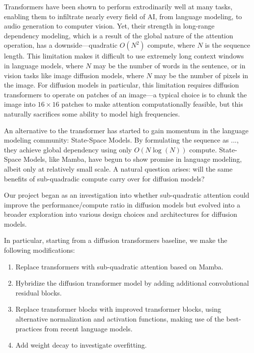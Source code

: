 Transformers have been shown to perform extrodinarily well at many tasks, enabling
them to infiltrate nearly every field of AI, from language modeling, to audio generation
to computer vision. Yet, their strength in long-range dependency modeling, which is a result
of the global nature of the attention operation, has a downside—quadratic $O(N^2)$ compute,
where $N$ is the sequence length. This limitation makes it difficult to use extremely long
context windows in language models, where $N$ may be the number of words in the sentence, or
in vision tasks like image diffusion models, where $N$ may be the number of pixels in the image.
For diffusion models in particular, this limitation requires diffusion transformers to operate
on patches of an image—a typical choice is to chunk the image into $16 \times 16$ patches to
make attention computationally feasible, but this naturally sacrifices some ability to model
high frequencies.

An alternative to the transformer has started to gain momentum in the language modeling community:
State-Space Models. By formulating the sequence as ..., they achieve global dependency using only
$O(N \log (N))$ compute. State-Space Models, like Mamba, have begun to show promise in language modeling,
albeit only at relatively small scale. A natural question arises: will the same benefits
of sub-quadradic compute carry over for diffusion models?

Our project began as an investigation into whether sub-quadratic attention
could improve the performance/compute ratio in diffusion models but evolved into a
broader exploration into various design choices and architectures for diffusion models.

In particular, starting from a diffusion transformers baseline, we make the following modifications:

\begin{enumerate}
    \item Replace transformers with sub-quadratic attention based on Mamba.
    \item Hybridize the diffusion transformer model by adding additional convolutional residual blocks.
    \item Replace transformer blocks with improved transformer blocks, using alternative normalization and activation functions, making use of the best-practices from recent language models.
    \item Add weight decay to investigate overfitting.
\end{enumerate}



